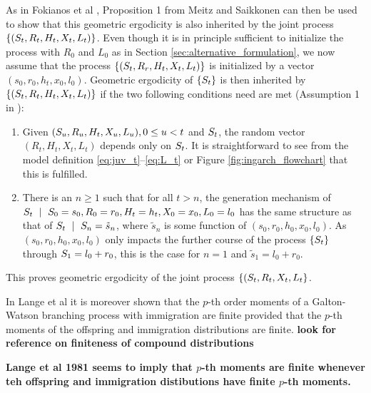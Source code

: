 \documentclass[10pt,a4paper]{article}
\begin{document}
As in Fokianos et al \cite{Fokianos2009}, Proposition 1 from Meitz and Saikkonen \cite{Meitz2008} can then be used to show that this geometric ergodicity is also inherited by the joint process $\{(S_t, R_t, H_t, X_t, L_t)\}$. %
Even though it is in principle sufficient to initialize the process with $R_0$ and $L_0$ as in Section \ref{sec:alternative_formulation}, we now assume that the process $\{(S_t, R_r, H_t, X_t, L_t)\}$ is initialized by a vector $(s_0, r_0, h_t, x_0, l_0)$. Geometric ergodicity of $\{S_t\}$ is then inherited by $\{(S_t, R_t, H_t, X_t, L_t)\}$ if the two following conditions need are met (Assumption 1 in \cite{Meitz2008}):

\begin{enumerate}
\item Given $(S_u, R_u, H_t, X_u, L_u), 0 \leq u < t$ and $S_t$, the random vector $(R_t, H_t, X_t, L_t)$ depends only on $S_t$. It is straightforward to see from the model definition \eqref{eq:juv_t}--\eqref{eq:L_t} or Figure \ref{fig:ingarch_flowchart} that this is fulfilled.
\item There is an $n \geq 1$ such that for all $t > n$, the generation mechanism of $\juv_t \ \mid \ \juv_0 = s_0, R_0 = r_0, H_t = h_t, X_0 = x_0, L_0 = l_0$ has the same structure as that of $\juv_t \ \mid \ \juv_n = \tilde{s}_n$, where $\tilde{s}_n$ is some function of $(s_0, r_0, h_0, x_0, l_0)$. As $(s_0, r_0, h_0, x_0, l_0)$ only impacts the further course of the process $\{S_t\}$ through $S_1 = l_0 + r_0$, this is the case for $n = 1$ and $\tilde{s}_1 = l_0 + r_0$.
\end{enumerate}
This proves geometric ergodicity of the joint process $\{(S_t, R_t, X_t, L_t\}$.

In Lange et al \cite[Sec. 4]{Lange1985} it is moreover shown that the $p$-th order moments of a Galton-Watson branching process with immigration are finite provided that the $p$-th moments of the offspring and immigration distributions are finite. \textbf{look for reference on finiteness of compound distributions}

\textbf{Lange et al 1981 seems to imply that $p$-th moments are finite whenever teh offspring and immigration distibutions have finite $p$-th moments.}


\end{document}
